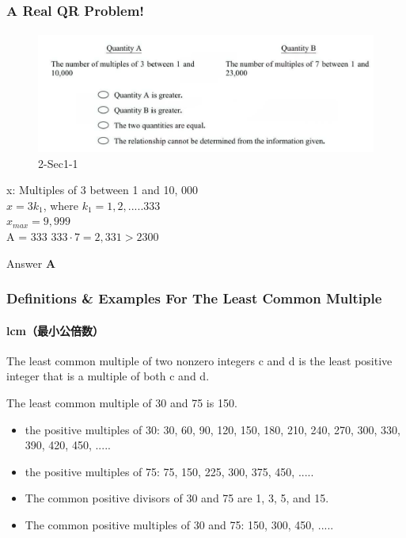 \documentclass[
	11pt, %
]{beamer}
\begin{document}
\begin{frame}
	\frametitle{A Real QR Problem!}
	\framesubtitle{}
	\begin{figure}
		\includegraphics[width=\linewidth]{Multiple_Example_Question1.png}
		\caption{2-Sec1-1}
	\end{figure}
	\pause
x: Multiples of 3 between 1 and 10, 000 \\ $x = 3k_1$, where $k_1 = 1, 2, ..... 333$ \\$x_{max} = 9,999$\\ A = 333 \quad
$333 \cdot 7 = 2,331 > 2300 $ \\
\pause

Answer \textbf{A}
\end{frame}


\begin{frame}
	\frametitle{Definitions \& Examples For The Least Common Multiple}
	\framesubtitle{lcm（最小公倍数）}
	
	\begin{definition}
	The least common multiple of two nonzero integers c and d is the least \alert{positive} integer that is a multiple of both c and d.
	\end{definition}
	
	\smallskip %
	
	\begin{example}
	The least common multiple of 30 and 75 is 150.
		\begin{itemize}
			\item the positive multiples of 30: 30, 60, 90, 120, 150, 180, 210, 240, 270, 300, 330, 390, 420, 450, .....
			\item the positive multiples of 75: 75, 150, 225, 300, 375, 450, .....
			\item The common positive divisors of 30 and 75 are 1, 3, 5, and 15.
			\item The common positive multiples of 30 and 75: 150, 300, 450, .....
		\end{itemize}
	\end{example}
\end{frame}
\end{document}
